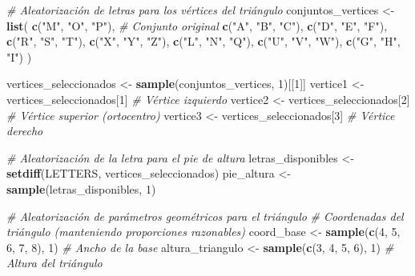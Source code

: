 \documentclass[
]{article}
\newenvironment{Shaded}{\begin{snugshade}}{\end{snugshade}}
\newcommand{\CommentTok}[1]{\textcolor[rgb]{0.56,0.35,0.01}{\textit{#1}}}
\newcommand{\DecValTok}[1]{\textcolor[rgb]{0.00,0.00,0.81}{#1}}
\newcommand{\FunctionTok}[1]{\textcolor[rgb]{0.13,0.29,0.53}{\textbf{#1}}}
\newcommand{\NormalTok}[1]{#1}
\newcommand{\OtherTok}[1]{\textcolor[rgb]{0.56,0.35,0.01}{#1}}
\newcommand{\StringTok}[1]{\textcolor[rgb]{0.31,0.60,0.02}{#1}}
\begin{document}
\begin{Shaded}
\begin{Highlighting}[]
\CommentTok{\# Aleatorización de letras para los vértices del triángulo}
\NormalTok{conjuntos\_vertices }\OtherTok{\textless{}{-}} \FunctionTok{list}\NormalTok{(}
  \FunctionTok{c}\NormalTok{(}\StringTok{"M"}\NormalTok{, }\StringTok{"O"}\NormalTok{, }\StringTok{"P"}\NormalTok{),  }\CommentTok{\# Conjunto original}
  \FunctionTok{c}\NormalTok{(}\StringTok{"A"}\NormalTok{, }\StringTok{"B"}\NormalTok{, }\StringTok{"C"}\NormalTok{),}
  \FunctionTok{c}\NormalTok{(}\StringTok{"D"}\NormalTok{, }\StringTok{"E"}\NormalTok{, }\StringTok{"F"}\NormalTok{),}
  \FunctionTok{c}\NormalTok{(}\StringTok{"R"}\NormalTok{, }\StringTok{"S"}\NormalTok{, }\StringTok{"T"}\NormalTok{),}
  \FunctionTok{c}\NormalTok{(}\StringTok{"X"}\NormalTok{, }\StringTok{"Y"}\NormalTok{, }\StringTok{"Z"}\NormalTok{),}
  \FunctionTok{c}\NormalTok{(}\StringTok{"L"}\NormalTok{, }\StringTok{"N"}\NormalTok{, }\StringTok{"Q"}\NormalTok{),}
  \FunctionTok{c}\NormalTok{(}\StringTok{"U"}\NormalTok{, }\StringTok{"V"}\NormalTok{, }\StringTok{"W"}\NormalTok{),}
  \FunctionTok{c}\NormalTok{(}\StringTok{"G"}\NormalTok{, }\StringTok{"H"}\NormalTok{, }\StringTok{"I"}\NormalTok{)}
\NormalTok{)}

\NormalTok{vertices\_seleccionados }\OtherTok{\textless{}{-}} \FunctionTok{sample}\NormalTok{(conjuntos\_vertices, }\DecValTok{1}\NormalTok{)[[}\DecValTok{1}\NormalTok{]]}
\NormalTok{vertice1 }\OtherTok{\textless{}{-}}\NormalTok{ vertices\_seleccionados[}\DecValTok{1}\NormalTok{]  }\CommentTok{\# Vértice izquierdo}
\NormalTok{vertice2 }\OtherTok{\textless{}{-}}\NormalTok{ vertices\_seleccionados[}\DecValTok{2}\NormalTok{]  }\CommentTok{\# Vértice superior (ortocentro)}
\NormalTok{vertice3 }\OtherTok{\textless{}{-}}\NormalTok{ vertices\_seleccionados[}\DecValTok{3}\NormalTok{]  }\CommentTok{\# Vértice derecho}

\CommentTok{\# Aleatorización de la letra para el pie de altura}
\NormalTok{letras\_disponibles }\OtherTok{\textless{}{-}} \FunctionTok{setdiff}\NormalTok{(LETTERS, vertices\_seleccionados)}
\NormalTok{pie\_altura }\OtherTok{\textless{}{-}} \FunctionTok{sample}\NormalTok{(letras\_disponibles, }\DecValTok{1}\NormalTok{)}

\CommentTok{\# Aleatorización de parámetros geométricos para el triángulo}
\CommentTok{\# Coordenadas del triángulo (manteniendo proporciones razonables)}
\NormalTok{coord\_base }\OtherTok{\textless{}{-}} \FunctionTok{sample}\NormalTok{(}\FunctionTok{c}\NormalTok{(}\DecValTok{4}\NormalTok{, }\DecValTok{5}\NormalTok{, }\DecValTok{6}\NormalTok{, }\DecValTok{7}\NormalTok{, }\DecValTok{8}\NormalTok{), }\DecValTok{1}\NormalTok{)  }\CommentTok{\# Ancho de la base}
\NormalTok{altura\_triangulo }\OtherTok{\textless{}{-}} \FunctionTok{sample}\NormalTok{(}\FunctionTok{c}\NormalTok{(}\DecValTok{3}\NormalTok{, }\DecValTok{4}\NormalTok{, }\DecValTok{5}\NormalTok{, }\DecValTok{6}\NormalTok{), }\DecValTok{1}\NormalTok{)  }\CommentTok{\# Altura del triángulo}


\end{Highlighting}
\end{Shaded}
\end{document}
